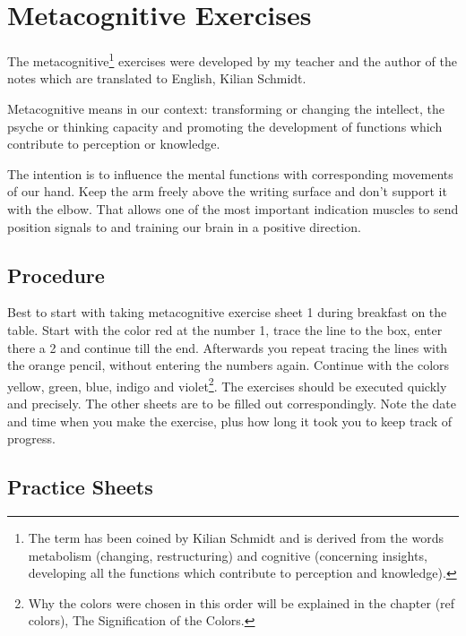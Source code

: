 \documentclass[../main.tex]{subfiles}
\begin{document}
  \chapter{Metacognitive Exercises}\label{metacognitive}
  The metacognitive\footnote{The term has been coined by Kilian Schmidt and is derived from the words metabolism (changing, restructuring) and cognitive (concerning insights, developing all the functions which contribute to perception and knowledge).} exercises were developed by my teacher and the author of the notes which are translated to English, Kilian Schmidt.


Metacognitive means in our context: {transforming} or changing the {intellect}, the
psyche or {thinking capacity}  and promoting the development of
functions which contribute to perception or knowledge.



The intention is to {influence the mental functions} with corresponding {movements of our hand}.
Keep the arm freely above the writing surface and don't support it with the elbow. {That allows one of the most important indication muscles to  send position signals to and training our brain in a positive direction.}

\section{Procedure}

Best to start with taking metacognitive exercise sheet 1 during breakfast on the table. Start with the color red at the number 1, trace the line to the box, enter there a 2 and continue till the end. Afterwards you repeat tracing the lines with the orange pencil, without entering the numbers again. Continue with the colors yellow, green, blue, indigo and violet\footnote{Why the colors were chosen in this order will be explained in the chapter (ref colors), The Signification of the Colors.}. The exercises should be executed quickly and precisely. The other sheets are to be filled out correspondingly. Note the date and time when you make the exercise, plus how long it took you to keep track of progress.


\newpage
\section{Practice Sheets}
\end{document}
